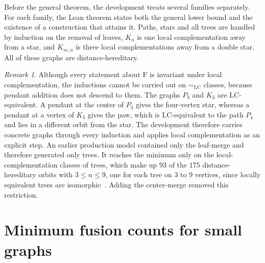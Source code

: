 \documentclass[aps,pra,onecolumn,superscriptaddress,nofootinbib,longbibliography]{revtex4-2}
\theoremstyle{plain}
\theoremstyle{remark}
\newtheorem{remark}[theorem]{Remark}
\newcommand{\F}{\mathrm{F}}
\newcommand{\LC}{\mathrm{LC}}
\begin{document}
Before the general theorem, the development treats several families separately. For each family, the
Lean theorem states both the general lower bound and the existence of a construction that attains it.
Paths, stars and all trees are handled by induction on the removal of leaves, $K_n$ is one local complementation away
from a star, and $K_{m,n}$ is three local complementations away from a double star. All of these graphs are
distance-hereditary.

\begin{remark}\label{rem:concrete}
Although every statement about $\F$ is invariant under local complementation, the inductions cannot be
carried out on $\sim_{\LC}$ classes, because pendant addition does not descend to them. The graphs $P_3$
and $K_3$ are $\LC$-equivalent. A pendant at the center of $P_3$ gives the four-vertex star, whereas a
pendant at a vertex of $K_3$ gives the paw, which is $\LC$-equivalent to the path $P_4$ and lies in a
different orbit from the star. The development therefore carries concrete graphs through every induction
and applies local complementation as an explicit step. An earlier production model contained only the leaf-merge and
therefore generated only trees. It reaches the minimum only on the local-complementation classes of trees,
which make up $93$ of the $175$ distance-hereditary orbits with $3\le n\le 9$, one for each tree on $3$ to
$9$ vertices, since locally equivalent trees are isomorphic~\cite{Bouchet1988transforming}. Adding the
center-merge removed this restriction.
\end{remark}

\section{Minimum fusion counts for small graphs}\label{sec:table}
\end{document}
